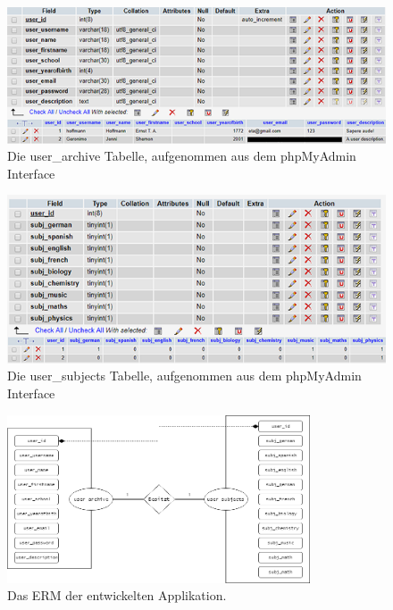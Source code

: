 \documentclass[a4paper,11pt]{report}
\begin{document}
				\begin{figure}
					\begin{center}
						\includegraphics[center]{user_archive.png}
						\caption{Die user\_archive Tabelle, aufgenommen aus dem phpMyAdmin Interface}
						\label{user_archive:PNG}
					\end{center}
				\end{figure}
				\begin{figure}
					\begin{center}
						\includegraphics[center]{user_subjects.png}
						\caption{Die user\_subjects Tabelle, aufgenommen aus dem phpMyAdmin Interface}
						\label{user_subjects:PNG}
					\end{center}
				\end{figure}
				\begin{figure}
					\begin{center}
						\includegraphics[width=0.8\textwidth]{ERM-Matura.png}
						\caption{Das ERM der entwickelten Applikation.}
						\label{ERM}
					\end{center}
				\end{figure}
				
\end{document}
